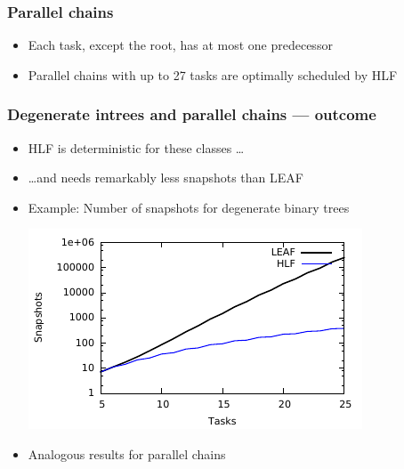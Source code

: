 \documentclass{beamer}
\begin{document}
\begin{frame}
  \frametitle{Parallel chains}
  \begin{itemize}
  \item Each task, except the root, has at most one predecessor
  \item Parallel chains with up to 27 tasks are optimally scheduled by HLF
  \end{itemize}
\end{frame}

\begin{frame}
  \frametitle{Degenerate intrees and parallel chains --- outcome}
  \begin{itemize}
  \item HLF is deterministic for these classes \dots
  \item \dots and needs remarkably less snapshots than LEAF
  \item Example: Number of snapshots for degenerate binary trees
    \begin{center}
      \includegraphics{deg_intrees.pdf}
    \end{center}
  \item Analogous results for parallel chains
  \end{itemize}
\end{frame}
\end{document}

